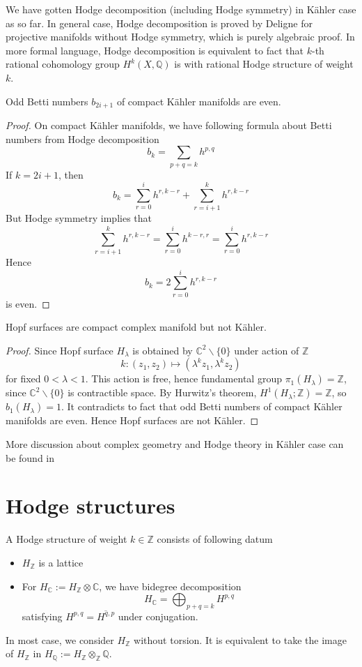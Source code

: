 \documentclass{amsart}
\begin{document}
We have gotten Hodge decomposition (including Hodge symmetry) in K\"ahler case as so far. In general case, Hodge decomposition is proved by Deligne for projective manifolds without Hodge symmetry, which is purely algebraic proof. In more formal language, Hodge decomposition is equivalent to fact that $k$-th rational cohomology group $H^k(X, \mathbb{Q})$ is with rational Hodge structure of weight $k$.
\begin{secprop}
	Odd Betti numbers $b_{2i+1}$ of compact K\"ahler manifolds are even.
\end{secprop}
\begin{proof}
	On compact K\"ahler manifolds, we have following formula about Betti numbers from Hodge decomposition
	\begin{equation}
		b_{k}= \sum_{p+q=k}h^{p,q}
	\end{equation}
	If $k=2i+1$, then 
	\[
	b_{k}= \sum_{r=0}^{i}h^{r,k-r} + \sum_{r=i+1}^{k}h^{r,k-r}
	\]
	But Hodge symmetry implies that 
	\[
	\sum_{r=i+1}^{k}h^{r,k-r}= \sum_{r=0}^{i}h^{k-r,r} =\sum_{r=0}^{i}h^{r,k-r}
	\]
	Hence 
	\[
	b_k= 2\sum_{r=0}^{i}h^{r,k-r}
	\]
	is even.
\end{proof}

\begin{seccor}
	Hopf surfaces are compact complex manifold but not K\"ahler.
\end{seccor}
\begin{proof}
	Since Hopf surface $H_\lambda$ is obtained by $\mathbb{C}^2 \backslash\{0\}$ under action of $\mathbb{Z}$
	\[
	k : (z_1, z_2) \mapsto (\lambda^k z_1, \lambda^k z_2)
	\]
	for fixed $0 < \lambda <1$.
	This action is free, hence fundamental group $\pi_1(H_\lambda)= \mathbb{Z}$, since $\mathbb{C}^2\backslash\{0\}$ is contractible space. By Hurwitz's theorem, $H^1(H_\lambda;\mathbb{Z})= \mathbb{Z}$, so $b_1(H_\lambda)=1$. It contradicts to fact that odd Betti numbers of compact K\"ahler manifolds are even. Hence Hopf surfaces are not K\"ahler. 
\end{proof}

\begin{rem}
	More discussion about complex geometry and Hodge theory in K\"ahler case can be found in \cite{Huybrechts2004,Griffiths1994}
\end{rem}
\section{Hodge structures}
\begin{secdefn}
A Hodge structure of weight $k \in \mathbb{Z}$ consists of following datum
\begin{itemize}
\item $H_{\mathbb{Z}}$ is a lattice
\item For $H_{\mathbb{C}}:= H_{\mathbb{Z}} \otimes \mathbb{C}$, we have bidegree decomposition
\[
H_{\mathbb{C}}= \bigoplus_{p+q=k} H^{p,q}
\]
satisfying $H^{p,q}= \overline{H^{q,p}}$ under conjugation.
\end{itemize}
\end{secdefn}
In most case, we consider $H_{\mathbb{Z}}$ without torsion. It is equivalent to take the image of $H_{\mathbb{Z}}$ in $H_{\mathbb{Q}}:= H_{\mathbb{Z}}\otimes_{\mathbb{Z}} \mathbb{Q}$.
\end{document}
